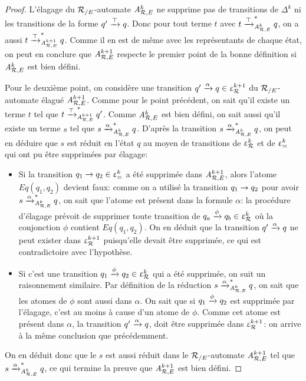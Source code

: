 \begin{proof}
L'élagage du ${\mathcal R_{/E}}$-automate ${\mathit A}_{\mathcal R,E}^k$ ne supprime pas de transitions de $\Delta^k$
ni les transitions de la forme $q'\xrightarrow{\top} q$. Donc pour tout terme $t$ avec
$t \xrightarrow{\top}_{{\mathit A}_{\mathcal R,E}^k}^* q$, on a aussi $t \xrightarrow{\top}_{{\mathit A}_{\mathcal R,E}^{k+1}}^* q$. Comme il en est de même
avec les représentants de chaque état, on peut en conclure que ${\mathit A}_{\mathcal R,E}^{k+1}$ respecte le premier
point de la bonne définition si ${\mathit A}_{\mathcal R,E}^k$ est bien défini.

Pour le deuxième point, on considère une transition $q' \xrightarrow{\alpha} q \in \upvarepsilon_{\mathcal R}^{k+1}$ du ${\mathcal R_{/E}}$-automate
élagué ${\mathit A}_{\mathcal R,E}^{k+1}$.
Comme pour le point précédent, on sait qu'il existe un terme $t$ tel que $t \xrightarrow{\top}_{{\mathit A}_{\mathcal R,E}^{k+1}}^* q'$. 
Comme ${\mathit A}_{\mathcal R,E}^{k}$ est bien défini, on sait aussi qu'il existe un terme $s$ tel que $s \xrightarrow{\alpha}_{{\mathit A}_{\mathcal R,E}^k}^* q$.
D'après la transition $s \xrightarrow{\alpha}_{{\mathit A}_{\mathcal R,E}^k}^* q$, on peut en déduire que $s$ est réduit en l'état $q$
au moyen de transitions de $\upvarepsilon_{\mathcal R}^k$ et de $\upvarepsilon_{=}^k$ qui ont pu être supprimées par élagage:
\begin{itemize}
\item 
  Si la transition $q_1 \rightarrow q_2 \in \upvarepsilon_{=}^k$ a été supprimée dans ${\mathit A}_{\mathcal R,E}^{k+1}$, alors l'atome $Eq(q_1,q_2)$
devient faux: comme on a utilisé la transition $q_1 \rightarrow q_2$ pour avoir $s \xrightarrow{\alpha}^*_{{\mathit A}_{\mathcal R,E}^k} q$,
on sait que l'atome est présent dans la formule $\alpha$: la procédure d'élagage prévoit de supprimer 
toute transition de $q_a \xrightarrow{\phi} q_b \in \upvarepsilon_{\mathcal R}^k$ où la conjonction $\phi$ contient  $Eq(q_1,q_2)$.
On en déduit que la transition $q' \xrightarrow{\alpha} q$ ne peut exister dans $\upvarepsilon_{\mathcal R}^{k+1}$ puisqu'elle devait être supprimée,
ce qui est contradictoire avec l'hypothèse.
\item 
  Si c'est une transition $q_1 \xrightarrow{\phi} q_2 \in \upvarepsilon_{\mathcal R}^k$ qui a été supprimée, on suit un raisonnement similaire.
  Par définition de la réduction $s \xrightarrow{\alpha}_{{\mathit A}_{\mathcal R,E}^k}^* q$, on sait que les atomes de $\phi$ sont aussi
  dans $\alpha$.  On sait que si $q_1 \xrightarrow{\phi} q_2$ est supprimée par l'élagage, c'est au moins à cause d'un atome
  de $\phi$. Comme cet atome est présent dans $\alpha$, la transition $q' \xrightarrow{\alpha} q$, doit être supprimée dans 
  $\upvarepsilon_{\mathcal R}^{k+1}$: on arrive à la même conclusion que précédemment.
\end{itemize}
On en déduit donc que le $s$ est aussi réduit dans le ${\mathcal R_{/E}}$-automate ${\mathit A}_{\mathcal R,E}^{k+1}$ tel que $s \xrightarrow{\alpha}^*_{{\mathit A}_{\mathcal R,E}^k} q$,
ce qui termine la preuve que ${\mathit A}_{\mathcal R,E}^{k+1}$ est bien défini.
\end{proof}

